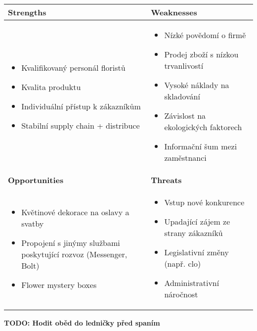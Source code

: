 \documentclass{article}
\begin{document}
\begin{table*}[h]
    \begin{tabular}{|p{195pt}|p{195pt}|}
        \hline \bfseries Strengths &\bfseries Weaknesses  \\
        \hline
        {\begin{itemize}
            \item Kvalifikovaný personál floristů
            \item Kvalita produktu
            \item Individuální přístup k zákazníkům
            \item Stabilní supply chain + distribuce
        \end{itemize}}
        &
        {\begin{itemize}
            \item Nízké povědomí o firmě
            \item Prodej zboží s nízkou trvanlivostí
            \item Vysoké náklady na skladování
            \item Závislost na ekologických faktorech
            \item Informační šum mezi zaměstnanci
        \end{itemize}} \\
        \hline \bfseries Opportunities &\bfseries Threats  \\
        \hline
        {\begin{itemize}
            \item Květinové dekorace na oslavy a svatby
            \item Propojení s jinýmy službami poskytující rozvoz (Messenger, Bolt)
            \item Flower mystery boxes
        \end{itemize}} &
        {\begin{itemize}
            \item Vstup nové konkurence
            \item Upadající zájem ze strany zákazníků
            \item Legislativní změny (např. clo)
            \item Administrativní náročnost
        \end{itemize}} \\
        \hline
    \end{tabular}
\end{table*}

\textbf{TODO: Hodit oběd do ledničky před spaním}
\end{document}
